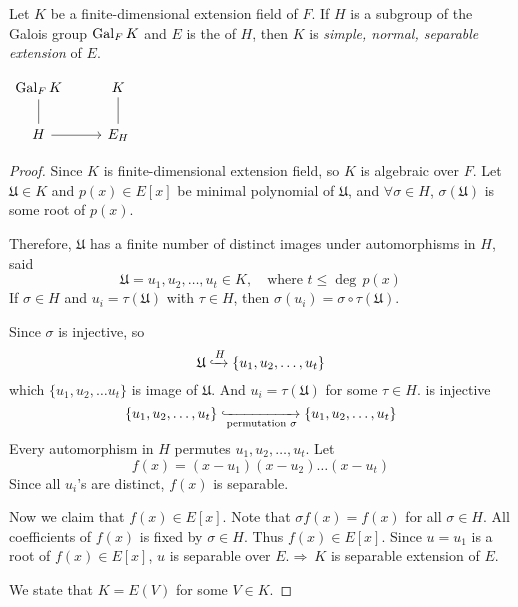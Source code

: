 \begin{lemma}
    Let $K$ be a finite-dimensional extension field of $F$. If $H$ is a subgroup of the Galois group 
    $\operatorname{Gal}_F K$ and $E$ is the  of $H$, then $K$ is 
    \textit{simple, normal, separable extension} of $E$.

    \begin{center}
        $\begin{tikzcd}
            \gal_F K  
            & K \arrow[dash]{d} \\
            H \arrow[dash]{u} \arrow[r]
            & E_H
            \end{tikzcd}
        $
    \end{center}
\end{lemma}
\begin{proof}
    Since $K$ is finite-dimensional extension field, so $K$ is algebraic over $F$. Let $\mathfrak{U} \in K$ and 
    $p(x) \in E[x]$ be minimal polynomial of $\mathfrak{U}$, and $\forall \sigma \in H$, $\sigma(\mathfrak{U})$ is 
    some root of $p(x)$.

    Therefore, $\mathfrak{U}$ has a finite number of distinct images under automorphisms in $H$, said 
    \[
        \mathfrak{U} = u_1, u_2, \ldots, u_t \in K, \quad \text{where } t \leq \deg\, p(x)
    \]
    If $\sigma \in H$ and $u_i = \tau(\mathfrak{U})$ with $\tau \in H$, then $\sigma(u_i) = \sigma \circ \tau (\mathfrak{U})$.

    Since $\sigma$ is injective, so 
    \[
        \mathfrak{U} \xhookrightarrow{H} \{ u_1, u_2, \ldots, u_t \}
    \]
    which $\{ u_1, u_2, \ldots u_t\}$ is image of $\mathfrak{U}$. And $u_i = \tau(\mathfrak{U})$ for some $\tau \in H$.
    is injective 
    \[
        \{ u_1, u_2, \ldots, u_t \} \xhookrightarrow[\text{permutation } \sigma]{} \{ u_1, u_2, \ldots, u_t \}
    \]
    Every automorphism in $H$ permutes $u_1, u_2, \ldots, u_t$. Let 
    \[
        f(x) = (x-u_1)(x-u_2)\ldots(x-u_t)
    \]
    Since all $u_i$'s are distinct, $f(x)$ is separable.

    Now we claim that $f(x) \in E[x]$. Note that $\sigma f(x) = f(x)$ for all $\sigma \in H$. All coefficients of 
    $f(x)$ is fixed by $\sigma \in H$. Thus $f(x) \in E[x]$. Since $u = u_1$ is a root of $f(x) \in E[x]$, $u$ is separable over 
    $E. \Longrightarrow \> K$ is separable extension of $E$.

    We state that $K = E(V)$ for some $V \in K$. 
\end{proof}
